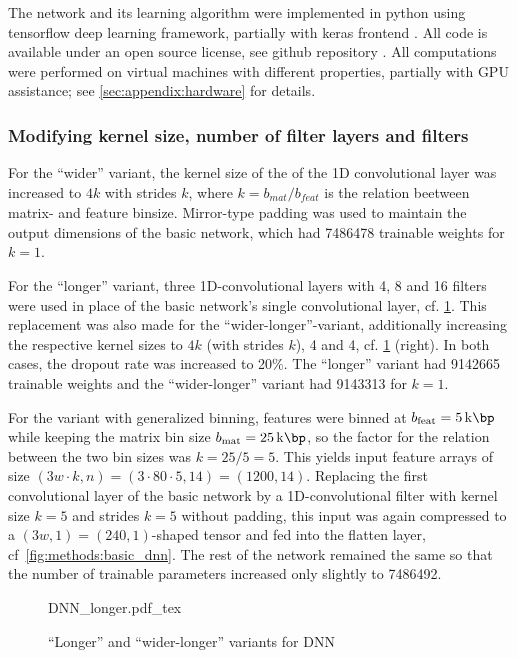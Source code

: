 The network and its learning algorithm were implemented in python using tensorflow deep learning framework, partially with keras frontend \cite{Abadi2015,Chollet2015}.
All code is available under an open source license, see github repository \cite{Krauth2021b}. 
All computations were performed on virtual machines with different properties, partially with GPU assistance; see \ref{sec:appendix:hardware} for details.

\subsubsection{Modifying kernel size, number of filter layers and filters} \label{sec:methods:variants}
For the ``wider'' variant, the kernel size of the of the 1D convolutional layer was increased to $4k$ with strides $k$,
where $k=b_\mathit{mat}/b_\mathit{feat}$ is the relation beetween matrix- and feature binsize.
Mirror-type padding was used to maintain the output dimensions of the basic network, which had \SI{7486478}{} trainable weights
for $k=1$.

For the ``longer'' variant, three 1D-convolutional layers with 4, 8 and 16 filters 
were used in place of the basic network's single convolutional layer, cf. \cref{fig:methods:longer_dnn}.
This replacement was also made for the ``wider-longer''-variant, 
additionally increasing the respective kernel sizes to $4k$ (with strides $k$), 4 and 4, cf. \cref{fig:methods:longer_dnn} (right).
In both cases, the dropout rate was increased to 20\%.
The ``longer'' variant had \SI{9142665}{} trainable weights and the ``wider-longer'' variant had \SI{9143313}{} for $k=1$.

For the variant with generalized binning, features were binned at $b_\textrm{feat} = \SI{5}{\kilo\bp}$ while keeping the matrix bin size $b_\textrm{mat} = \SI{25}{\kilo\bp}$,
so the factor for the relation between the two bin sizes was $k=25/5=5$.
This yields input feature arrays of size $(3w\cdot k, n) = (3\cdot80\cdot5 , 14) = (1200, 14)$.
Replacing the first convolutional layer of the basic network by a 1D-convolutional filter with kernel size $k=5$ and strides $k=5$ without padding,
this input was again compressed to a $(3w, 1) = (240, 1)$-shaped tensor and fed into the flatten layer, cf~\cref{fig:methods:basic_dnn}. 
The rest of the network remained the same so that the number of trainable parameters increased only slightly to \SI{7486492}{}.
\begin{figure}[p]
    \small
    \centering
    {DNN_longer.pdf_tex}
    \caption{``Longer'' and ``wider-longer'' variants for DNN}
    \label{fig:methods:longer_dnn}
\end{figure}

